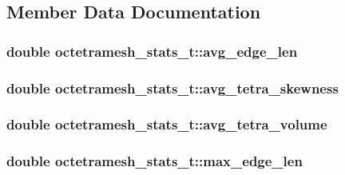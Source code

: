 \subsection{Member Data Documentation}
\hypertarget{structoctetramesh__stats__t_a17af1fd993f2b5e989e1a1a60bedb724}{
\subsubsection[{avg\_\-edge\_\-len}]{\setlength{\rightskip}{0pt plus 5cm}double {\bf octetramesh\_\-stats\_\-t::avg\_\-edge\_\-len}}}
\label{structoctetramesh__stats__t_a17af1fd993f2b5e989e1a1a60bedb724}
\hypertarget{structoctetramesh__stats__t_aad26b465bf205cb20b5eb30a034eb53c}{
\subsubsection[{avg\_\-tetra\_\-skewness}]{\setlength{\rightskip}{0pt plus 5cm}double {\bf octetramesh\_\-stats\_\-t::avg\_\-tetra\_\-skewness}}}
\label{structoctetramesh__stats__t_aad26b465bf205cb20b5eb30a034eb53c}
\hypertarget{structoctetramesh__stats__t_a72b15fcae3f9d7774e7c88d4bbcc00d3}{
\subsubsection[{avg\_\-tetra\_\-volume}]{\setlength{\rightskip}{0pt plus 5cm}double {\bf octetramesh\_\-stats\_\-t::avg\_\-tetra\_\-volume}}}
\label{structoctetramesh__stats__t_a72b15fcae3f9d7774e7c88d4bbcc00d3}
\hypertarget{structoctetramesh__stats__t_a561ac510e2dc56e169d230b7462bc0c6}{
\subsubsection[{max\_\-edge\_\-len}]{\setlength{\rightskip}{0pt plus 5cm}double {\bf octetramesh\_\-stats\_\-t::max\_\-edge\_\-len}}}
